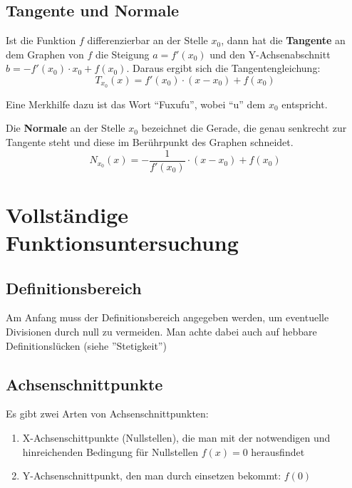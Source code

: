 \documentclass[main.tex]{subfiles}
\begin{document}
\subsection{Tangente und Normale}

\begin{Theorem}
	Ist die Funktion $f$ differenzierbar an der Stelle $x_{0}$, dann hat die \textbf{Tangente} an dem Graphen von $f$ die Steigung $a=f'(x_{0})$ und den Y-Achsenabschnitt $b=-f'(x_{0})\cdot x_{0}+f(x_{0})$. Daraus ergibt sich die Tangentengleichung:
	$$T_{x_{0}}(x)=f'(x_{0})\cdot (x-x_{0})+f(x_{0}) $$
\end{Theorem}

\begin{Bemerkung}
	Eine Merkhilfe dazu ist das Wort "`Fuxufu"', wobei "`u"' dem $x_{0}$ entspricht.
\end{Bemerkung}

\begin{Definition}
	Die \textbf{Normale} an der Stelle $x_{0}$ bezeichnet die Gerade, die genau senkrecht zur Tangente steht und diese im Berührpunkt des Graphen schneidet.
	$$N_{x_{0}}(x)=-\frac{1}{f'(x_{0})}\cdot (x-x_{0})+f(x_{0})$$
\end{Definition}


\section{Vollständige Funktionsuntersuchung}


\subsection{Definitionsbereich}

Am Anfang muss der Definitionsbereich angegeben werden, um eventuelle Divisionen durch null zu vermeiden. Man achte dabei auch auf hebbare Definitionslücken (siehe ''Stetigkeit'')


\subsection{Achsenschnittpunkte}

Es gibt zwei Arten von Achsenschnittpunkten:
\begin{enumerate}
	\item X-Achsenschittpunkte (Nullstellen), die man mit der notwendigen und hinreichenden Bedingung für Nullstellen $f(x)=0$ herausfindet
	\item Y-Achsenschnittpunkt, den man durch einsetzen bekommt: $f(0)$
\end{enumerate}
\end{document}
